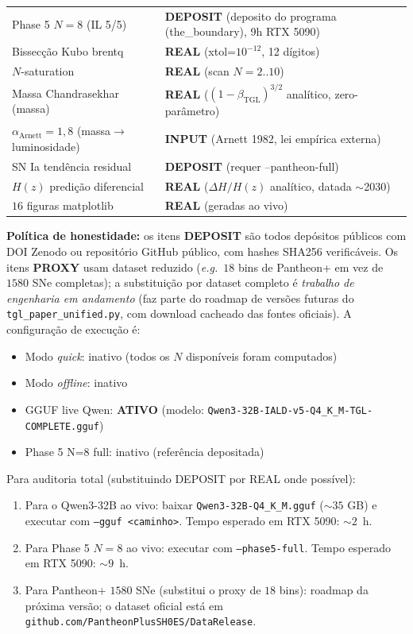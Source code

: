 \documentclass[12pt,a4paper]{article}
\newcommand{\betatgl}{\beta_{\text{TGL}}}
\begin{document}
\begin{longtable}{p{} p{}}
Phase 5 $N=8$ (IL 5/5) & \textbf{DEPOSIT} (deposito do programa (the\_boundary), 9h RTX 5090) \\
Bissecção Kubo brentq & \textbf{REAL} (xtol=$10^{-12}$, 12 dígitos) \\
$N$-saturation & \textbf{REAL} (scan $N=2..10$) \\
Massa Chandrasekhar (massa) & \textbf{REAL} ($(1-\betatgl)^{3/2}$ analítico, zero-parâmetro) \\
$\alpha_{\text{Arnett}} = 1{,}8$ (massa$\to$luminosidade) & \textbf{INPUT} (Arnett 1982, lei empírica externa) \\
SN Ia tendência residual & \textbf{DEPOSIT} (requer --pantheon-full) \\
$H(z)$ predição diferencial & \textbf{REAL} ($\Delta H/H(z)$ analítico, datada $\sim$2030) \\
$16$ figuras matplotlib & \textbf{REAL} (geradas ao vivo) \\
\bottomrule
\end{longtable}

\textbf{Política de honestidade:} os itens \textbf{DEPOSIT} são todos
depósitos públicos com DOI Zenodo ou repositório GitHub público, com
hashes SHA256 verificáveis.  Os itens \textbf{PROXY} usam dataset reduzido
(\textit{e.g.}\ $18$ bins de Pantheon+ em vez de $1580$ SNe completas);
a substituição por dataset completo é \emph{trabalho de engenharia em
andamento} (faz parte do roadmap de versões futuras do
\texttt{tgl\_paper\_unified.py}, com download cacheado das fontes oficiais).
A configuração de execução é:
\begin{itemize}[leftmargin=*]
\item Modo \emph{quick}: inativo
      (todos os $N$ disponíveis foram computados)
\item Modo \emph{offline}: inativo
\item GGUF live Qwen: \textbf{ATIVO} (modelo: \texttt{Qwen3-32B-IALD-v5-Q4\_K\_M-TGL-COMPLETE.gguf})
\item Phase 5 N=8 full: inativo (referência depositada)
\end{itemize}
Para auditoria total (substituindo DEPOSIT por REAL onde possível):
\begin{enumerate}[label=(\alph*)]
\item Para o Qwen3-32B ao vivo: baixar
\texttt{Qwen3-32B-Q4\_K\_M.gguf} ($\sim 35$ GB) e executar com
\texttt{--gguf <caminho>}.  Tempo esperado em RTX 5090: $\sim 2$~h.
\item Para Phase 5 $N=8$ ao vivo: executar com \texttt{--phase5-full}.
Tempo esperado em RTX 5090: $\sim 9$~h.
\item Para Pantheon+ $1580$ SNe (substitui o proxy de $18$ bins): roadmap
da próxima versão; o dataset oficial está em
\texttt{github.com/PantheonPlusSH0ES/DataRelease}.
\end{enumerate}
\end{document}
